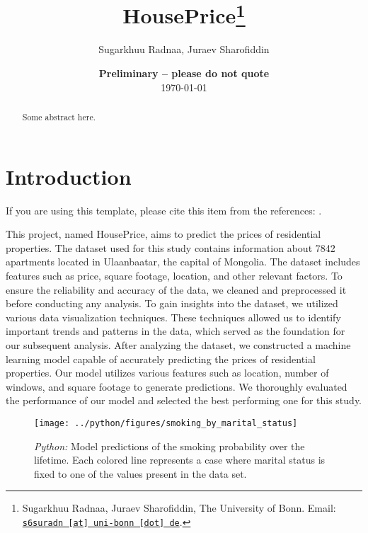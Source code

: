 \documentclass[11pt, a4paper, leqno]{article}
\begin{document}
\title{HousePrice\thanks{Sugarkhuu Radnaa, Juraev Sharofiddin, The University of Bonn. Email: \href{mailto:s6suradn@uni-bonn.de}{\nolinkurl{s6suradn [at] uni-bonn [dot] de}}.}}

\author{Sugarkhuu Radnaa, Juraev Sharofiddin}

\date{
    {\bf Preliminary -- please do not quote}
    \\[1ex]
    \today
}

\maketitle


\begin{abstract}
    Some abstract here.
\end{abstract}

\clearpage


\section{Introduction} %
\label{sec:introduction}

If you are using this template, please cite this item from the references:
\citet{GaudeckerEconProjectTemplates}.

This project, named HousePrice, aims to predict the prices of residential properties.
The dataset used for this study contains information about 7842 apartments located in Ulaanbaatar, the capital of Mongolia.
The dataset includes features such as price, square footage, location, and other relevant factors.
To ensure the reliability and accuracy of the data, we cleaned and preprocessed it before conducting any analysis.
To gain insights into the dataset, we utilized various data visualization techniques.
These techniques allowed us to identify important trends and patterns in the data, which served as the foundation for our subsequent analysis.
After analyzing the dataset, we constructed a machine learning model capable of accurately predicting the prices of residential properties.
Our model utilizes various features such as location, number of windows, and square footage to generate predictions.
We thoroughly evaluated the performance of our model and selected the best performing one for this study.



\begin{figure}[H]

    \centering
    \texttt{[image: ../python/figures/smoking\_by\_marital\_status]}

    \caption{\emph{Python:} Model predictions of the smoking probability over the
        lifetime. Each colored line represents a case where marital status is fixed to one
        of the values present in the data set.}
    \label{fig:python-predictions}

\end{figure}
\end{document}
